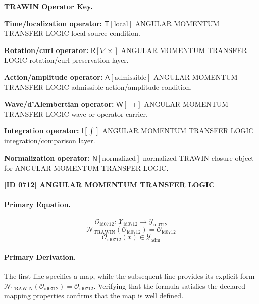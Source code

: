 \par\vspace{0.45\baselineskip}
\noindent\begin{minipage}[t]{\linewidth}
\begingroup
\small
\raggedright
\textbf{TRAWIN Operator Key.}\par
\noindent\textbf{Time/localization operator:} $\mathsf{T}\!\left[\mathrm{local}\right]$ ANGULAR MOMENTUM TRANSFER LOGIC local source condition.\par
\noindent\textbf{Rotation/curl operator:} $\mathsf{R}\!\left[\nabla\times\right]$ ANGULAR MOMENTUM TRANSFER LOGIC rotation/curl preservation layer.\par
\noindent\textbf{Action/amplitude operator:} $\mathsf{A}\!\left[\mathrm{admissible}\right]$ ANGULAR MOMENTUM TRANSFER LOGIC admissible action/amplitude condition.\par
\noindent\textbf{Wave/d'Alembertian operator:} $\mathsf{W}\!\left[\Box\right]$ ANGULAR MOMENTUM TRANSFER LOGIC wave or operator carrier.\par
\noindent\textbf{Integration operator:} $\mathsf{I}\!\left[\int\right]$ ANGULAR MOMENTUM TRANSFER LOGIC integration/comparison layer.\par
\noindent\textbf{Normalization operator:} $\mathsf{N}\!\left[\mathrm{normalized}\right]$ normalized TRAWIN closure object for ANGULAR MOMENTUM TRANSFER LOGIC.\par
\endgroup
\end{minipage}

\clearpage
\noindent\textbf{[ID 0712] ANGULAR MOMENTUM TRANSFER LOGIC}\par
\vspace{0.35em}
\paragraph{Primary Equation.}
\[
\mathcal{O}_{\mathrm{id0712}}:\mathcal{X}_{\mathrm{id0712}}\longrightarrow\mathcal{Y}_{\mathrm{id0712}}
\]
\[
\mathcal{N}_{\mathrm{TRAWIN}}(\mathcal{O}_{\mathrm{id0712}})=\mathcal{O}_{\mathrm{id0712}}
\]
\[
\mathcal{O}_{\mathrm{id0712}}(x)\in\mathcal{Y}_{\mathrm{adm}}
\]

\paragraph{Primary Derivation.}
The first line specifies a map, while the subsequent line provides its explicit form \( \mathcal{N}_{\mathrm{TRAWIN}}(\mathcal{O}_{\mathrm{id0712}})=\mathcal{O}_{\mathrm{id0712}} \). Verifying that the formula satisfies the declared mapping properties confirms that the map is well defined.
